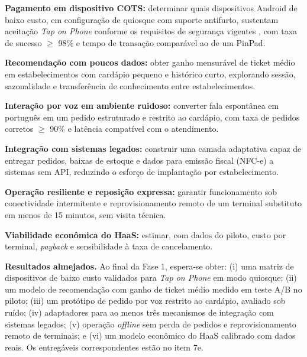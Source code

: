 \documentclass[12pt,a4paper]{article}
\begin{document}
\begin{description}[leftmargin=1.1cm, labelindent=0pt, style=sameline]
    \item[D1.] \textbf{Pagamento em dispositivo COTS:} determinar quais dispositivos Android de baixo custo, em configuração de quiosque com suporte antifurto, sustentam aceitação \textit{Tap on Phone} conforme os requisitos de segurança vigentes \cite{pci_cpoc, pci_mpoc}, com taxa de sucesso $\geq$ 98\% e tempo de transação comparável ao de um PinPad.
    \item[D2.] \textbf{Recomendação com poucos dados:} obter ganho mensurável de ticket médio em estabelecimentos com cardápio pequeno e histórico curto, explorando sessão, sazonalidade e transferência de conhecimento entre estabelecimentos.
    \item[D3.] \textbf{Interação por voz em ambiente ruidoso:} converter fala espontânea em português em um pedido estruturado e restrito ao cardápio, com taxa de pedidos corretos $\geq$ 90\% e latência compatível com o atendimento.
    \item[D4.] \textbf{Integração com sistemas legados:} construir uma camada adaptativa capaz de entregar pedidos, baixas de estoque e dados para emissão fiscal (NFC-e) a sistemas sem API, reduzindo o esforço de implantação por estabelecimento.
    \item[D5.] \textbf{Operação resiliente e reposição expressa:} garantir funcionamento sob conectividade intermitente e reprovisionamento remoto de um terminal substituto em menos de 15 minutos, sem visita técnica.
    \item[D6.] \textbf{Viabilidade econômica do HaaS:} estimar, com dados do piloto, custo por terminal, \textit{payback} e sensibilidade à taxa de cancelamento.
\end{description}

\textbf{Resultados almejados.} Ao final da Fase 1, espera-se obter: (i) uma matriz de dispositivos de baixo custo validados para \textit{Tap on Phone} em modo quiosque; (ii) um modelo de recomendação com ganho de ticket médio medido em teste A/B no piloto; (iii) um protótipo de pedido por voz restrito ao cardápio, avaliado sob ruído; (iv) adaptadores para ao menos três mecanismos de integração com sistemas legados; (v) operação \textit{offline} sem perda de pedidos e reprovisionamento remoto de terminais; e (vi) um modelo econômico do HaaS calibrado com dados reais. Os entregáveis correspondentes estão no item 7e.
\end{document}
